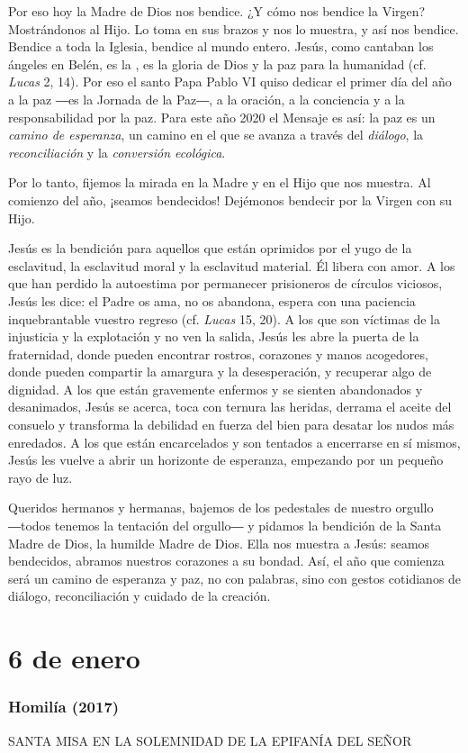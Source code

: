 Por eso hoy la Madre de Dios nos bendice. ¿Y cómo nos bendice la Virgen? Mostrándonos al Hijo. Lo toma en sus brazos y nos lo muestra, y así nos bendice. Bendice a toda la Iglesia, bendice al mundo entero. Jesús, como cantaban los ángeles en Belén, es la , es la gloria de Dios y la paz para la humanidad (cf. \emph{Lucas} 2, 14). Por eso el santo Papa Pablo VI quiso dedicar el primer día del año a la paz ―es la Jornada de la Paz―, a la oración, a la conciencia y a la responsabilidad por la paz. Para este año 2020 el Mensaje es así: la paz es un \emph{camino de esperanza}, un camino en el que se avanza a través del \emph{diálogo}, la \emph{reconciliación} y la \emph{conversión ecológica}.

Por lo tanto, fijemos la mirada en la Madre y en el Hijo que nos muestra. Al comienzo del año, ¡seamos bendecidos! Dejémonos bendecir por la Virgen con su Hijo.

Jesús es la bendición para aquellos que están oprimidos por el yugo de la esclavitud, la esclavitud moral y la esclavitud material. Él libera con amor. A los que han perdido la autoestima por permanecer prisioneros de círculos viciosos, Jesús les dice: el Padre os ama, no os abandona, espera con una paciencia inquebrantable vuestro regreso (cf. \emph{Lucas} 15, 20). A los que son víctimas de la injusticia y la explotación y no ven la salida, Jesús les abre la puerta de la fraternidad, donde pueden encontrar rostros, corazones y manos acogedores, donde pueden compartir la amargura y la desesperación, y recuperar algo de dignidad. A los que están gravemente enfermos y se sienten abandonados y desanimados, Jesús se acerca, toca con ternura las heridas, derrama el aceite del consuelo y transforma la debilidad en fuerza del bien para desatar los nudos más enredados. A los que están encarcelados y son tentados a encerrarse en sí mismos, Jesús les vuelve a abrir un horizonte de esperanza, empezando por un pequeño rayo de luz.

Queridos hermanos y hermanas, bajemos de los pedestales de nuestro orgullo ―todos tenemos la tentación del orgullo― y pidamos la bendición de la Santa Madre de Dios, la humilde Madre de Dios. Ella nos muestra a Jesús: seamos bendecidos, abramos nuestros corazones a su bondad. Así, el año que comienza será un camino de esperanza y paz, no con palabras, sino con gestos cotidianos de diálogo, reconciliación y cuidado de la creación.



\section{6 de enero} \subsubsection{Homilía (2017)} SANTA MISA EN LA SOLEMNIDAD DE LA EPIFANÍA DEL SEÑOR

